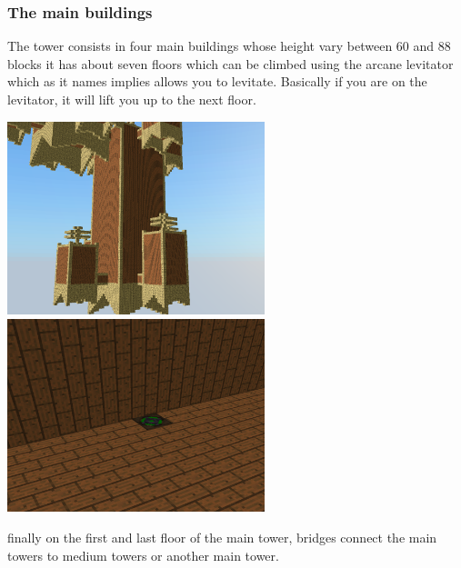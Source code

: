 \documentclass[article]{report}         %
\begin{document}
        \subsubsection{The main buildings}
          The tower consists in four main buildings whose height vary between 60 and 88 blocks it has about seven floors which can be climbed using the arcane levitator which as it names implies allows you to levitate. Basically if you are on the levitator, it will lift you up to the next floor.

          \begin{center}
            \includegraphics[width=7.5cm]{images/DT/Main.png}
            \includegraphics[width=7.5cm]{images/DT/floor.png}
          \end{center}
        finally on the first and last floor of the main tower, bridges connect the main towers to medium towers or another main tower.
\end{document}
